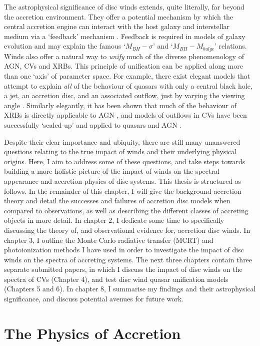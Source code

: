 The astrophysical significance of disc winds extends, quite literally, 
far beyond the accretion environment. They offer a potential mechanism by which the central
accretion engine can interact with the host galaxy and interstellar medium 
via a `feedback' mechanism \citep{king2003,fabian2012}. 
Feedback is required in models of galaxy evolution \citep{springel2005}
and may explain the famous `$M_{BH}-\sigma$' \citep{silkrees1998,haring2004}
and `$M_{BH}-M_{bulge}$' \citep{magorrian1998} relations.
Winds also offer a natural way to {\em unify} much
of the diverse phenomenology of AGN, CVs and XRBs. This principle of unification
can be applied along more than one `axis' of parameter space. For example, 
there exist elegant models that attempt to explain {\em all}
of the behaviour of quasars with only a central black hole, a jet, an accretion disc,
and an associated outflow, just by varying the viewing angle \citep{elvis2000}.
Similarly elegantly, it has been shown that much of the behaviour of XRBs
is directly applicable to AGN \citep{mchardy2006}, 
and models of outflows in CVs have been successfully `scaled-up'
and applied to quasars and AGN \citep[e.g.][]{higginbottom2013}.

Despite their clear importance and ubiquity, there are still
many unanswered questions relating to the true impact of winds and their underlying
physical origins. Here, I aim to address some of these questions, and 
take steps towards building a more holistic picture of the impact
of winds on the spectral appearance and accretion physics of disc systems.
This thesis is structured as follows. In the remainder of this chapter, 
I will give the background accretion theory 
and detail the successes and failures of accretion 
disc models when compared to observations,
as well as describing the different classes of accreting objects in more detail. 
In chapter 2, I dedicate some time to specifically discussing the theory of,
and observational evidence for, accretion disc winds. In chapter 3, I outline 
the Monte Carlo radiative transfer (MCRT) and photoionization
methods I have used in order to investigate the impact of disc 
winds on the spectra of accreting systems. The next three chapters
contain three separate submitted papers, in which I discuss the impact
of disc winds on the spectra of CVs (Chapter 4), and test disc wind
quasar unification models (Chapters 5 and 6).
In chapter 8, I summarise my findings and their astrophysical significance, 
and discuss potential avenues for future work.


\section{The Physics of Accretion}

